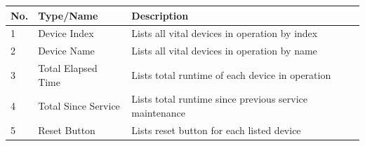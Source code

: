 \begin{longtable}[]{@{}lll@{}}
\toprule
\begin{minipage}[b]{0.04\columnwidth}\raggedright
No.\strut
\end{minipage} & \begin{minipage}[b]{0.23\columnwidth}\raggedright
Type/Name\strut
\end{minipage} & \begin{minipage}[b]{0.65\columnwidth}\raggedright
Description\strut
\end{minipage}\tabularnewline
\midrule
\endhead
\begin{minipage}[t]{0.04\columnwidth}\raggedright
1\strut
\end{minipage} & \begin{minipage}[t]{0.23\columnwidth}\raggedright
Device Index\strut
\end{minipage} & \begin{minipage}[t]{0.65\columnwidth}\raggedright
Lists all vital devices in operation by index\strut
\end{minipage}\tabularnewline
\begin{minipage}[t]{0.04\columnwidth}\raggedright
2\strut
\end{minipage} & \begin{minipage}[t]{0.23\columnwidth}\raggedright
Device Name\strut
\end{minipage} & \begin{minipage}[t]{0.65\columnwidth}\raggedright
Lists all vital devices in operation by name\strut
\end{minipage}\tabularnewline
\begin{minipage}[t]{0.04\columnwidth}\raggedright
3\strut
\end{minipage} & \begin{minipage}[t]{0.23\columnwidth}\raggedright
Total Elapsed Time\strut
\end{minipage} & \begin{minipage}[t]{0.65\columnwidth}\raggedright
Lists total runtime of each device in operation\strut
\end{minipage}\tabularnewline
\begin{minipage}[t]{0.04\columnwidth}\raggedright
4\strut
\end{minipage} & \begin{minipage}[t]{0.23\columnwidth}\raggedright
Total Since Service\strut
\end{minipage} & \begin{minipage}[t]{0.65\columnwidth}\raggedright
Lists total runtime since previous service maintenance\strut
\end{minipage}\tabularnewline
\begin{minipage}[t]{0.04\columnwidth}\raggedright
5\strut
\end{minipage} & \begin{minipage}[t]{0.23\columnwidth}\raggedright
Reset Button\strut
\end{minipage} & \begin{minipage}[t]{0.65\columnwidth}\raggedright
Lists reset button for each listed device\strut
\end{minipage}\tabularnewline
\bottomrule
\end{longtable}

